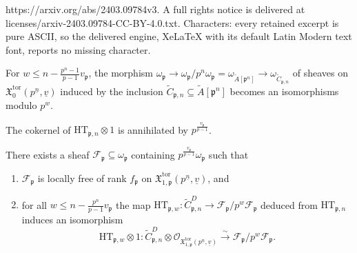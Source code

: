 \documentclass[10pt,a4paper]{amsart}
\newcommand{\HT}{\mathrm{HT}}
\newcommand{\cF}{{\mathcal F}}
\newcommand{\cO}{{\mathcal O}}
\newcommand{\frakX}{\mathfrak X}
\newcommand{\frakp}{\mathfrak p}
\newcommand{\tor}{\mathrm{tor}} %
\begin{document}
https://arxiv.org/abs/2403.09784v3. A full rights notice is delivered at licenses/arxiv-2403.09784-CC-BY-4.0.txt. Characters: every retained excerpt is pure ASCII, so the delivered engine, XeLaTeX with its default Latin Modern text font, reports no missing character.
\begin{proposition} \label{prop:omega_isom}
For $w\leqslant n-\frac{p^n-1}{p-1}v_\frakp$,
the morphism $\omega_{\frakp}  \rightarrow  \omega_{\frakp}/p^n\omega_{\frakp}
=\omega_{\widetilde{A}[\frakp^n]} \to  \omega_{\widetilde{C}_{\frakp,n}}$ of sheaves on $\frakX_0^\tor(p^{\underline{n}},\underline{v})$
induced by the inclusion $\widetilde{C}_{\frakp,n}\subseteq \widetilde{A}[\frakp^n]$
 becomes an isomorphisms modulo $p^w$.
\end{proposition}

\begin{proposition} \label{prop:cokerHT}
    The cokernel of $\HT_{\frakp,n}\otimes 1$
     is annihilated  by $p^\frac{v_\frakp}{p-1}$.
\end{proposition}

\begin{theorem}
There exists a sheaf $\cF_\frakp\subseteq \omega_\frakp$  containing $p^{\frac{v_\frakp}{p-1}}\omega_\frakp$ such that
\begin{enumerate}
    \item $\cF_\frakp$ is locally free of rank $f_\frakp$ on $\frakX_{1,\frakp}^\tor(p^{\underline{n}},\underline{v})$, and 
    \item  for all $w\leqslant n-\frac{p^n}{p-1}v_\frakp$ the  map
$\HT_{\frakp,w}\colon \widetilde{C}_{\frakp,n}^{D} \rightarrow \cF_{\frakp}/p^w\cF_{\frakp}$
deduced from $\HT_{\frakp,n}$ induces an isomorphism
\[
\HT_{\frakp,w} \otimes 1 \colon \widetilde{C}_{\frakp,n}^{D}\otimes \cO_{\frakX_{1,\frakp}^\tor(p^{\underline{n}},\underline{v})} \xrightarrow{\sim} \cF_\frakp/p^w\cF_{\frakp}.
\]
\end{enumerate}
\end{theorem}
\end{document}
